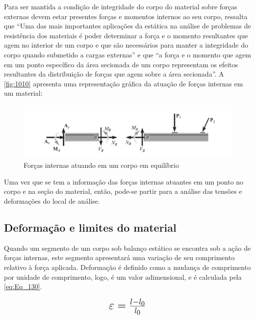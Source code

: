 Para ser mantida a condição de integridade do corpo do material sobre forças externas devem estar presentes forças e momentos internos ao seu corpo,
\autocite{Hibbeler2010} ressalta que “Uma das mais importantes aplicações da estática na análise de problemas de resistência dos materiais é poder
determinar a força e o momento resultantes que agem no interior de um corpo e que são necessários para manter a integridade do corpo quando
submetido a cargas externas” e que “a força e o momento que agem em um ponto específico da área secionada de um corpo representam os efeitos resultantes
da distribuição de forças que agem sobre a área secionada”. A \autoref{fig:1010} apresenta uma representação gráfica da atuação de forças internas em um material:

\begin{figure}[htb]
	\caption{\label{fig:1010} Forças internas atuando em um corpo em equilíbrio}
	\begin{center}
		\includegraphics[width=\textwidth]{pictures/1010.png}
	\end{center}
\end{figure}

Uma vez que se tem a informação das forças internas atuantes em um ponto no corpo e na seção do material, então, pode-se partir para a análise das tensões
e deformações do local de análise.

\subsection{Deformação e limites do material}

Quando um segmento de um corpo sob balanço estático se encontra sob a ação de forças internas, este segmento apresentará uma variação de seu comprimento relativo
à força aplicada. Deformação é definido como a mudança de comprimento por unidade de comprimento, logo, é um valor adimensional,
e é calculada pela \autoref{eq:Eq_130}.\autocite{Norton2011}

\begin{equation}\label{eq:Eq_130}%
\mbox{\fontsize{17.28}{21.6}\selectfont\( %
\varepsilon = \frac{l - l_0}{l_0}
\)} %
\end{equation}

